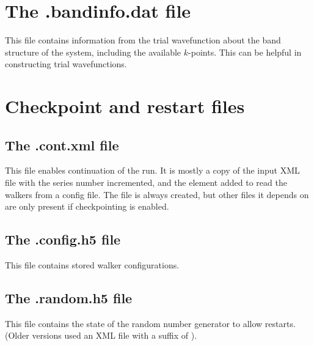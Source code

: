 \section{The .bandinfo.dat file}
\label{sec:bandinfo_file}
This file contains information from the trial wavefunction about the band structure of the system,
including the available $k$-points. This can
be helpful in constructing trial wavefunctions.


\section{Checkpoint and restart files}
\label{sec:checkpoint_files}
\subsection{The .cont.xml file}
This file enables continuation of the run.  It is mostly a copy of the input XML file with the series number incremented, and the  element added to read the walkers from a config file.   The  file is always created, but other files it depends on are only present if checkpointing is enabled.

\subsection{The .config.h5 file}
This file contains stored walker configurations.

\subsection{The .random.h5 file}
This file contains the state of the random number generator to allow restarts.
(Older versions used an XML file with a suffix of ).

